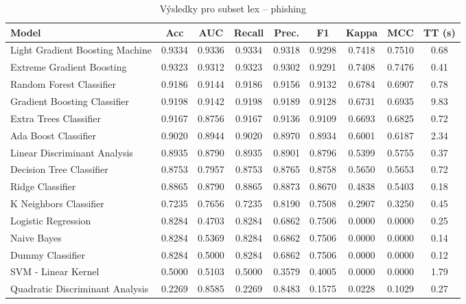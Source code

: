 \begin{table}[H]
  \centering
  \small
  \caption{Výsledky pro subset lex – phishing}
  \begin{tabular}{|l|c|c|c|c|c|c|c|c|}
    \hline
    \textbf{Model} & \textbf{Acc} & \textbf{AUC} & \textbf{Recall} & \textbf{Prec.} & \textbf{F1} & \textbf{Kappa} & \textbf{MCC} & \textbf{TT (s)} \\
    \hline
    Light Gradient Boosting Machine & 0.9334 & 0.9336 & 0.9334 & 0.9318 & 0.9298 & 0.7418 & 0.7510 & 0.68 \\
    Extreme Gradient Boosting & 0.9323 & 0.9312 & 0.9323 & 0.9302 & 0.9291 & 0.7408 & 0.7476 & 0.41 \\
    Random Forest Classifier & 0.9186 & 0.9144 & 0.9186 & 0.9156 & 0.9132 & 0.6784 & 0.6907 & 0.78 \\
    Gradient Boosting Classifier & 0.9198 & 0.9142 & 0.9198 & 0.9189 & 0.9128 & 0.6731 & 0.6935 & 9.83 \\
    Extra Trees Classifier & 0.9167 & 0.8756 & 0.9167 & 0.9136 & 0.9109 & 0.6693 & 0.6825 & 0.72 \\
    Ada Boost Classifier & 0.9020 & 0.8944 & 0.9020 & 0.8970 & 0.8934 & 0.6001 & 0.6187 & 2.34 \\
    Linear Discriminant Analysis & 0.8935 & 0.8790 & 0.8935 & 0.8901 & 0.8796 & 0.5399 & 0.5755 & 0.37 \\
    Decision Tree Classifier & 0.8753 & 0.7957 & 0.8753 & 0.8765 & 0.8758 & 0.5650 & 0.5653 & 0.72 \\
    Ridge Classifier & 0.8865 & 0.8790 & 0.8865 & 0.8873 & 0.8670 & 0.4838 & 0.5403 & 0.18 \\
    K Neighbors Classifier & 0.7235 & 0.7656 & 0.7235 & 0.8190 & 0.7508 & 0.2907 & 0.3250 & 0.45 \\
    Logistic Regression & 0.8284 & 0.4703 & 0.8284 & 0.6862 & 0.7506 & 0.0000 & 0.0000 & 0.25 \\
    Naive Bayes & 0.8284 & 0.5369 & 0.8284 & 0.6862 & 0.7506 & 0.0000 & 0.0000 & 0.14 \\
    Dummy Classifier & 0.8284 & 0.5000 & 0.8284 & 0.6862 & 0.7506 & 0.0000 & 0.0000 & 0.12 \\
    SVM - Linear Kernel & 0.5000 & 0.5103 & 0.5000 & 0.3579 & 0.4005 & 0.0000 & 0.0000 & 1.79 \\
    Quadratic Discriminant Analysis & 0.2269 & 0.8585 & 0.2269 & 0.8483 & 0.1575 & 0.0228 & 0.1029 & 0.27 \\
    \hline
  \end{tabular}
\end{table}
\vspace{0.5cm}

